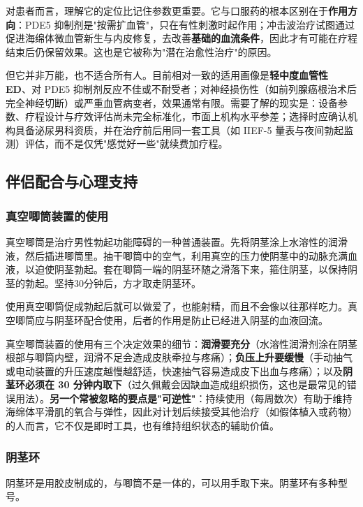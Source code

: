 对患者而言，理解它的定位比记住参数更重要。它与口服药的根本区别在于\textbf{作用方向}：PDE5 抑制剂是"按需扩血管"，只在有性刺激时起作用；冲击波治疗试图通过促进海绵体微血管新生与内皮修复，去改善\textbf{基础的血流条件}，因此才有可能在疗程结束后仍保留效果。这也是它被称为"潜在治愈性治疗"的原因。

但它并非万能，也不适合所有人。目前相对一致的适用画像是\textbf{轻中度血管性 ED}、对 PDE5 抑制剂反应不佳或不耐受者；对神经损伤性（如前列腺癌根治术后完全神经切断）或严重血管病变者，效果通常有限。需要了解的现实是：设备参数、疗程设计与疗效评估尚未完全标准化，市面上机构水平参差；选择时应确认机构具备泌尿男科资质，并在治疗前后用同一套工具（如 IIEF-5 量表与夜间勃起监测）评估，而不是仅凭"感觉好一些"就续费加疗程。

\subsection{伴侣配合与心理支持}

\subsubsection{真空唧筒装置的使用}

真空唧筒是治疗男性勃起功能障碍的一种普通装置。先将阴茎涂上水溶性的润滑液，然后插进唧筒里。抽干唧筒中的空气，利用真空的压力使阴茎中的动脉充满血液，以迫使阴茎勃起。套在唧筒一端的阴茎环随之滑落下来，箍住阴茎，以保持阴茎的勃起。坚持30分钟后，方才取走阴茎环。

使用真空唧筒促成勃起后就可以做爱了，也能射精，而且不会像以往那样吃力。真空唧筒应与阴茎环配合使用，后者的作用是防止已经进入阴茎的血液回流。


真空唧筒装置的使用有三个决定效果的细节：\textbf{润滑要充分}（水溶性润滑剂涂在阴茎根部与唧筒内壁，润滑不足会造成皮肤牵拉与疼痛）；\textbf{负压上升要缓慢}（手动抽气或电动装置的升压速度越慢越舒适，快速抽气容易造成皮下出血与疼痛）；以及\textbf{阴茎环必须在 30 分钟内取下}（过久佩戴会因缺血造成组织损伤，这也是最常见的错误用法）。\textbf{另一个常被忽略的要点是"可逆性"}：持续使用（每周数次）有助于维持海绵体平滑肌的氧合与弹性，因此对计划后续接受其他治疗（如假体植入或药物）的人而言，它不仅是即时工具，也有维持组织状态的辅助价值。

\subsubsection{阴茎环}

阴茎环是用胶皮制成的，与唧筒不是一体的，可以用手取下来。阴茎环有多种型号。

